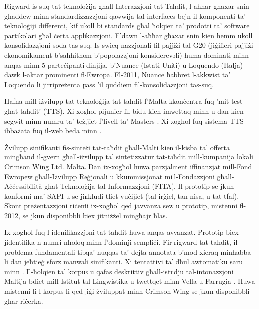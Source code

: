 \documentclass[]{../../metanetpaper}
\begin{document}
\begin{multicols}{2}

Rigward is-suq tat-teknoloġija għall-Interazzjoni tat-Taħdit, l-aħħar għaxar snin għaddew minn standardizzazzjoni qawwija tal-interfaces bejn il-komponenti ta’ teknoloġiji differenti, kif ukoll bi standards għal ħolqien ta’ prodotti ta’ software partikolari għal ċerta applikazzjoni. F’dawn l-aħħar għaxar snin kien hemm ukoll konsolidazzjoni soda tas-suq. Is-swieq nazzjonali fil-pajjiżi tal-G20 (jiġifieri pajjiżi ekonomikament b'saħħithom b’popolazzjoni konsiderevoli) huma dominati minn anqas minn 5 parteċipanti dinjija, b’Nuance (Istati Uniti) u Loquendo (Italja) dawk l-aktar prominenti fl-Ewropa. Fl-2011, Nuance ħabbret l-akkwist ta' Loquendo li jirripreżenta pass 'il quddiem fil-konsolidazzjoni tas-suq.

Ħafna mill-iżvilupp tat-teknoloġija tat-taħdit f'Malta kkonċentra fuq 'mit-test għat-taħdit' (TTS). Xi xogħol pijunier fil-bidu kien imwettaq minn \cite{Micallef:1997} u dan kien segwit minn numru ta’ teżijiet f’livell ta’ Masters \cite{Farrugia:2005}. Xi xogħol fuq sistema TTS ibbażata fuq il-web beda minn \cite{Buhagiar-Micallef:2008}.

Żvilupp sinifikanti fis-sinteżi tat-taħdit għall-Malti kien il-kisba ta’ offerta mingħand il-gvern għall-iżvilupp ta’ sintetizzatur tat-taħdit mill-kumpanija lokali Crimson Wing Ltd. Malta. Dan ix-xogħol huwa parzjalment iffinanzjat mill-Fond Ewropew għall-Iżvilupp Reġjonali u kkummissjonat mill-Fondazzjoni għall-Aċċessibilità għat-Teknoloġija tal-Informazzjoni (FITA). Il-prototip se jkun konformi ma’ SAPI u se jinkludi tliet vuċijiet (tal-irġiel, tan-nisa, u tat-tfal). Skont preżentazzjoni riċenti \cite{Borg-et-al:2011} ix-xogħol qed javvanza sew u prototip, mistenni fl-2012, se jkun disponibbli biex jitniżżel mingħajr ħlas.

Ix-xogħol fuq l-idenifikazzjoni tat-taħdit huwa anqas avvanzat. Prototip biex jidentifika n-numri nħoloq minn \cite{Calleja:2002} f’dominji sempliċi. Fir-rigward tat-taħdit, il-problema fundamentali tibqa’ nuqqas ta’ dejta annotata b’mod xieraq minħabba li dan jeħtieġ sforz manwali sinifikanti. Xi tentattivi ta’ dħul awtomatiku saru minn \cite{Psaila:2008}. Il-ħolqien ta’ korpus u qafas deskrittiv għall-istudju tal-intonazzjoni Maltija bdiet mill-Istitut tal-Lingwistika u twettqet minn Vella u Farrugia \cite{Vella-Farrugia:2006}. Huwa mistenni li l-korpus li qed jiġi żviluppat minn Crimson Wing se jkun disponibbli għar-riċerka.


\end{multicols}
\end{document}
